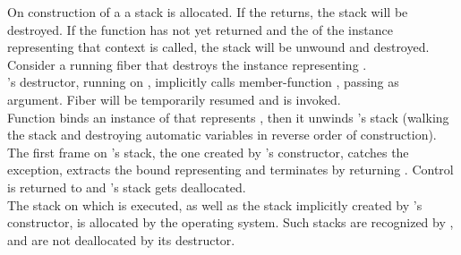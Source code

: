 \label{destruction}

On construction of a \fiber a stack is allocated. If the \entryfn\xspace returns,
the stack will be destroyed. If the function has not yet returned and the
 of the \fiber instance representing that context is called,
the stack will be unwound and destroyed.\\

Consider a running fiber  that destroys the \fiber instance
representing .\\

's destructor, running on , implicitly calls member-function
\resumewith, passing \unwindfib as
argument. Fiber  will be temporarily resumed and \unwindfib is
invoked.\\
Function \unwindfib binds an instance of \fiber that
represents , then it unwinds 's stack
(walking the stack and destroying automatic variables in reverse order of
construction).
The first frame on 's stack, the one created by \fiber's constructor,
catches the exception,
extracts the bound \fiber representing  and terminates  by returning
. Control is returned to  and 's
stack gets deallocated.\\

The stack on which  is executed, as well as the stack implicitly
created by \thread's constructor, is allocated by the operating
system. Such stacks are recognized by \fiber, and are not deallocated by its
destructor.
